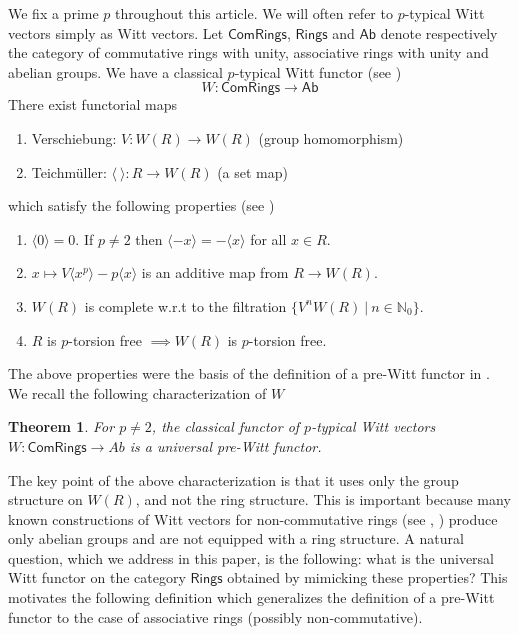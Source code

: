 \documentclass[11pt]{amsart}
\theoremstyle{plain}
\newtheorem{theorem}[thm]{Theorem}
\theoremstyle{definition}
\newcommand{\N}{{\mathbb N}}
\newcommand{\ab}[1]{\langle {#1} \rangle}
\newcommand{\Rings}{{\mathsf{Rings}}}
\newcommand{\Com}{{\mathsf{ComRings}}}
\newcommand{\Ab}{{\mathsf{Ab}}}
\begin{document}
\noindent We fix a prime $p$ throughout this article. We will often refer to $p$-typical Witt vectors simply as Witt vectors. Let $\Com$, $\Rings$ and $\Ab$ denote respectively the category of commutative rings with unity, associative rings with unity and abelian groups. We have a classical $p$-typical Witt functor (see \cite{w}) $$W: \Com \to \Ab$$ There exist functorial maps 
\begin{enumerate}\label{W-properties}
    \item Verschiebung: $V:W(R)\to W(R)$ (group homomorphism)
    \item Teichm\"{u}ller: $\ab{\ }: R\to W(R)$ (a set map)
\end{enumerate}
which satisfy the following properties (see \cite{ps})
\begin{enumerate}
    \item $\ab{0}=0$. If $p\neq 2$ then $\ab{-x} = -\ab{x}$ for all $x \in R$.
    \item $x \mapsto V\ab{x^p} -p\ab{x}$ is an additive map from $R \to W(R)$. 
    \item $W(R)$ is complete w.r.t to the filtration $\{V^nW(R)\ | \ n \in \N_0 \}$.
    \item $R$ is $p$-torsion free $\implies W(R)$ is $p$-torsion free.
\end{enumerate}
\noindent The above properties were the basis of the definition of a pre-Witt functor in \cite{ps}. We recall the following characterization of $W$ 
\begin{theorem}\cite[Theorem 1.6]{ps}\label{commain} For $p\neq 2$, the classical functor of $p$-typical Witt vectors $W: \Com \to Ab$ is a universal pre-Witt functor.
\end{theorem}
\noindent The key point of the above characterization is that it uses only the group structure on $W(R)$, and not the ring structure. This is important because many known constructions of Witt vectors for non-commutative rings (see \cite{b}, \cite{J}) produce only abelian groups and are not equipped with a ring structure. A natural question, which we address in this paper, is the following: what is the universal Witt functor on the category $\Rings$ obtained by mimicking these properties?
This motivates the following definition which generalizes the definition of a pre-Witt functor \cite[Definition 1.3]{ps} to the case of associative rings (possibly non-commutative). 
\end{document}
